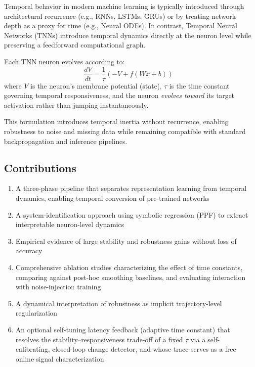 \documentclass[11pt]{article}
\begin{document}
Temporal behavior in modern machine learning is typically introduced through architectural recurrence (e.g., RNNs, LSTMs, GRUs) or by treating network depth as a proxy for time (e.g., Neural ODEs). In contrast, Temporal Neural Networks (TNNs) introduce temporal dynamics directly at the neuron level while preserving a feedforward computational graph.

Each TNN neuron evolves according to:
\begin{equation}
\frac{dV}{dt} = \frac{1}{\tau}\left(-V + f(Wx + b)\right)
\label{eq:tnn}
\end{equation}
where $V$ is the neuron's membrane potential (state), $\tau$ is the time constant governing temporal responsiveness, and the neuron \emph{evolves toward} its target activation rather than jumping instantaneously.

This formulation introduces temporal inertia without recurrence, enabling robustness to noise and missing data while remaining compatible with standard backpropagation and inference pipelines.

\subsection{Contributions}

\begin{enumerate}
    \item A three-phase pipeline that separates representation learning from temporal dynamics, enabling temporal conversion of pre-trained networks
    \item A system-identification approach using symbolic regression (PPF) to extract interpretable neuron-level dynamics
    \item Empirical evidence of large stability and robustness gains without loss of accuracy
    \item Comprehensive ablation studies characterizing the effect of time constants, comparing against post-hoc smoothing baselines, and evaluating interaction with noise-injection training
    \item A dynamical interpretation of robustness as implicit trajectory-level regularization
    \item An optional self-tuning latency feedback (adaptive time constant) that resolves the stability--responsiveness trade-off of a fixed $\tau$ via a self-calibrating, closed-loop change detector, and whose trace serves as a free online signal characterization
\end{enumerate}
\end{document}

